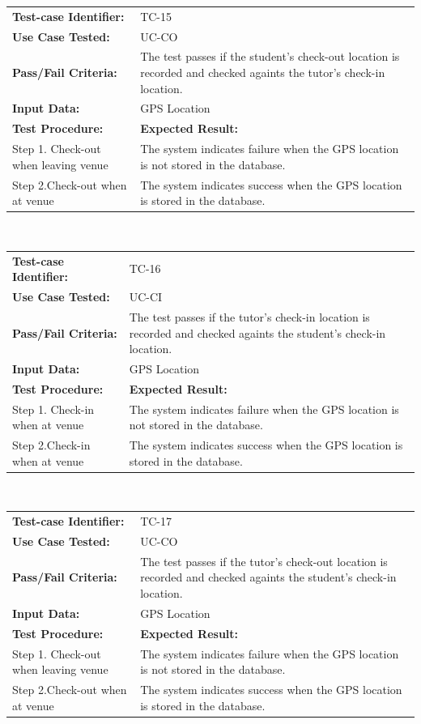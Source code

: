 \documentclass[12pt]{article}
\begin{document}
{\begin{tabular}{| p{8cm} | p{8cm} |} \hline
	\textbf{Test-case Identifier:}& TC-15\\
	\textbf{Use Case Tested:}& UC-CO\\
	\textbf{Pass/Fail Criteria:}& The test passes if the student's check-out location is recorded and checked againts the tutor's check-in location.\\
	\textbf{Input Data:}& GPS Location\\\hline
	\textbf{Test Procedure:}& \textbf{Expected Result:} \\\hline
	Step 1. Check-out when leaving venue & The system indicates failure when the GPS location is not stored in the database. \\
	Step 2.Check-out when at venue & The system indicates success when the GPS location is stored in the database.\\
		\hline
\end{tabular}
\\

\begin{tabular}{| p{8cm} | p{8cm} |} \hline
	\textbf{Test-case Identifier:}& TC-16\\
	\textbf{Use Case Tested:}& UC-CI\\
	\textbf{Pass/Fail Criteria:}& The test passes if the tutor's check-in location is recorded and checked againts the student's check-in location.\\
	\textbf{Input Data:}& GPS Location\\\hline
	\textbf{Test Procedure:}& \textbf{Expected Result:} \\\hline
	Step 1. Check-in when at venue & The system indicates failure when the GPS location is not stored in the database. \\
	Step 2.Check-in when at venue & The system indicates success when the GPS location is  stored in the database.\\
		\hline
\end{tabular}
\\

\begin{tabular}{| p{8cm} | p{8cm} |} \hline
	\textbf{Test-case Identifier:}& TC-17\\
	\textbf{Use Case Tested:}& UC-CO\\
	\textbf{Pass/Fail Criteria:}& The test passes if the tutor's check-out location is recorded and checked againts the student's check-in location.\\
	\textbf{Input Data:}& GPS Location\\\hline
	\textbf{Test Procedure:}& \textbf{Expected Result:} \\\hline
	Step 1. Check-out when leaving venue & The system indicates failure when the GPS location is not stored in the database. \\
	Step 2.Check-out when at venue & The system indicates success when the GPS location is stored in the database.\\
		\hline
\end{tabular}
\\

}
\end{document}
